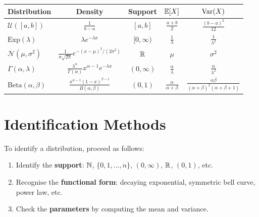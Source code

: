 \begin{keyformulas}[title=\textbf{Continuous distributions summary}]
\begin{center}
\renewcommand{\arraystretch}{1.4}
\begin{tabular}{lcccc}
    \toprule
    \textbf{Distribution} & \textbf{Density} & \textbf{Support} & $\mathbb{E}[X]$ & $\mathrm{Var}(X)$ \\
    \midrule
    $\mathcal{U}([a,b])$ & $\frac{1}{b-a}$ & $[a,b]$ & $\frac{a+b}{2}$ & $\frac{(b-a)^2}{12}$ \\[4pt]
    $\mathrm{Exp}(\lambda)$ & $\lambda e^{-\lambda x}$ & $[0,\infty)$ & $\frac{1}{\lambda}$ & $\frac{1}{\lambda^2}$ \\[4pt]
    $\mathcal{N}(\mu,\sigma^2)$ & $\frac{1}{\sigma\sqrt{2\pi}}e^{-(x-\mu)^2/(2\sigma^2)}$ & $\mathbb{R}$ & $\mu$ & $\sigma^2$ \\[4pt]
    $\Gamma(\alpha,\lambda)$ & $\frac{\lambda^\alpha}{\Gamma(\alpha)}x^{\alpha-1}e^{-\lambda x}$ & $(0,\infty)$ & $\frac{\alpha}{\lambda}$ & $\frac{\alpha}{\lambda^2}$ \\[4pt]
    $\mathrm{Beta}(\alpha,\beta)$ & $\frac{x^{\alpha-1}(1-x)^{\beta-1}}{B(\alpha,\beta)}$ & $(0,1)$ & $\frac{\alpha}{\alpha+\beta}$ & $\frac{\alpha\beta}{(\alpha+\beta)^2(\alpha+\beta+1)}$ \\
    \bottomrule
\end{tabular}
\end{center}
\end{keyformulas}

\section{Identification Methods}

\begin{remark}
To identify a distribution, proceed as follows:
\begin{enumerate}
    \item Identify the \textbf{support}: $\mathbb{N}$, $\{0,1,\ldots,n\}$, $(0,\infty)$,
          $\mathbb{R}$, $(0,1)$, etc.
    \item Recognise the \textbf{functional form}: decaying exponential, symmetric
          bell curve, power law, etc.
    \item Check the \textbf{parameters} by computing the mean and variance.
\end{enumerate}
\end{remark}

